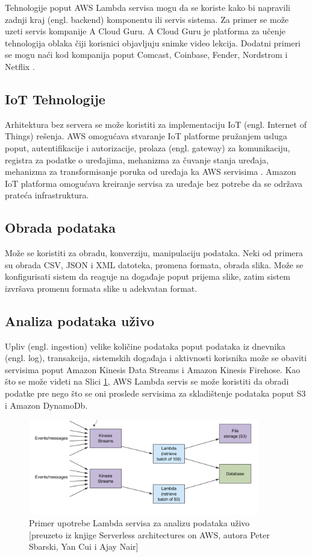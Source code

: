 \documentclass[12pt,oneside]{memoir}
\begin{document}
Tehnologije poput AWS Lambda servisa mogu da se koriste kako bi napravili zadnji kraj (engl. backend) komponentu ili servis sistema. Za primer se može uzeti servis kompanije A Cloud Guru. A Cloud Guru je platforma za učenje tehnologija oblaka čiji korisnici objavljuju snimke video lekcija. Dodatni primeri se mogu naći kod kompanija poput Comcast, Coinbase, Fender, Nordstrom i Netflix \cite{ascs}.

\subsection{IoT Tehnologije}

Arhitektura bez servera se može koristiti za implementaciju IoT (engl. Internet of Things) rešenja. AWS omogućava stvaranje IoT platforme pružanjem usluga poput, autentifikacije i autorizacije, prolaza (engl. gateway) za komunikaciju, registra za podatke o uređajima, mehanizma za čuvanje stanja uređaja, mehanizma za transformisanje poruka od uređaja ka AWS servisima \cite{aicf}. Amazon IoT platforma omogućava kreiranje servisa za uređaje bez potrebe da se održava prateća infrastruktura.

\subsection{Obrada podataka}
Može se koristiti za obradu, konverziju, manipulaciju podataka. Neki od primera su obrada CSV, JSON i XML datoteka, promena formata, obrada slika. Može se konfigurisati sistem da reaguje na događaje poput prijema slike, zatim sistem izvršava promenu formata slike u adekvatan format.

\subsection{Analiza podataka uživo}
Upliv (engl. ingestion) velike količine podataka poput podataka iz dnevnika (engl. log), transakcija, sistemskih događaja i aktivnosti korisnika može se obaviti servisima poput Amazon Kinesis Data Streams i Amazon Kinesis Firehose. Kao što se može videti na Slici \ref{fig:AnalizaPodataka}, AWS Lambda servis se može koristiti da obradi podatke pre nego što se oni proslede servisima za skladištenje podataka poput S3 i Amazon DynamoDb.

\begin{figure}[!ht]
  \centering
  \includegraphics[width=0.9\textwidth]{Slika 8.png}
  \caption{Primer upotrebe Lambda servisa za analizu podataka uživo\\\footnotesize[preuzeto iz knjige Serverless architectures on AWS, autora Peter Sbarski, Yan Cui i Ajay Nair]}
  \label{fig:AnalizaPodataka}
\end{figure}
\end{document}
